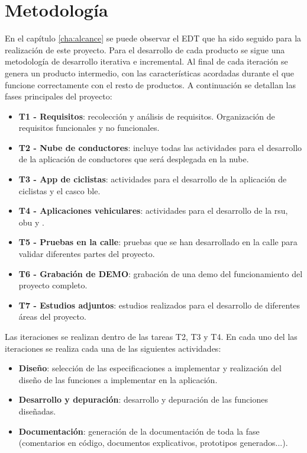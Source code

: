 \chapter{Metodología}\label{cha:metodologia}
En el capítulo \ref{cha:alcance} se puede observar el EDT que ha sido seguido para la realización de este proyecto. Para el desarrollo de cada producto se sigue una metodología de desarrollo iterativa e incremental. Al final de cada iteración se genera un producto intermedio, con las características acordadas durante el  que funcione correctamente con el resto de productos.  A continuación se detallan las fases principales del proyecto:

\begin{itemize}
	\item \textbf{T1 - Requisitos}: recolección y análisis de requisitos. Organización de requisitos funcionales y no funcionales.
	
	\item \textbf{T2 - Nube de conductores}: incluye todas las actividades para el desarrollo de la aplicación de conductores que será desplegada en la nube.
	
	\item \textbf{T3 - App de ciclistas}: actividades para el desarrollo de la aplicación de ciclistas y el casco \gls{ble}.
	
	\item \textbf{T4 - Aplicaciones vehiculares}: actividades para el desarrollo de la \gls{rsu}, \gls{obu} y .
	
	\item \textbf{T5 - Pruebas en la calle}: pruebas que se han desarrollado en la calle para validar diferentes partes del proyecto.
	
	\item \textbf{T6 - Grabación de DEMO}: grabación de una demo del funcionamiento del proyecto completo.
	
	\item \textbf{T7 - Estudios adjuntos}: estudios realizados para el desarrollo de diferentes áreas del proyecto.
\end{itemize}

Las iteraciones se realizan dentro de las tareas T2, T3 y T4. En cada uno del las iteraciones se realiza cada una de las siguientes actividades:
\begin{itemize}
	\item \textbf{Diseño}: selección de las especificaciones a implementar y realización del diseño de las funciones a implementar en la aplicación.
	
	\item \textbf{Desarrollo y depuración}: desarrollo y depuración de las funciones diseñadas. 
	
	\item \textbf{Documentación}: generación de la documentación de toda la fase (comentarios en código, documentos explicativos, prototipos generados...).
\end{itemize}

